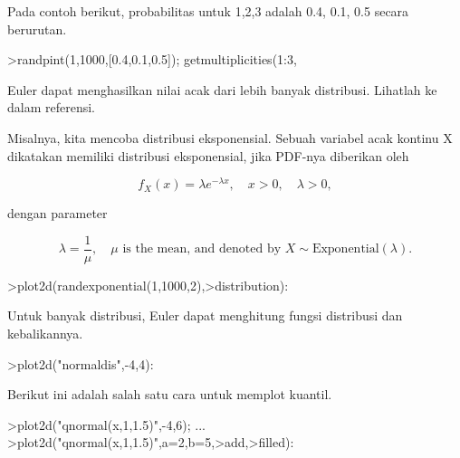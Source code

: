 \documentclass[12pt,Times new roman,letterpaper]{book}
\begin{document}
\begin{eulernootebook}
\begin{eulercomment}
\begin{eulercomment}
\begin{eulernootebook}
\begin{eulercomment}
\begin{eulercomment}
\begin{eulercomment}
\begin{eulercomment}
\begin{eulercomment}
\begin{eulercomment}
\begin{eulercomment}
\begin{eulercomment}
Pada contoh berikut, probabilitas untuk 1,2,3 adalah 0.4, 0.1, 0.5
secara berurutan.
\end{eulercomment}
\begin{eulerprompt}
>randpint(1,1000,[0.4,0.1,0.5]); getmultiplicities(1:3,%
\end{eulerprompt}
\begin{euleroutput}
  [378,  102,  520]
\end{euleroutput}
\begin{eulercomment}
Euler dapat menghasilkan nilai acak dari lebih banyak distribusi.
Lihatlah ke dalam referensi.

Misalnya, kita mencoba distribusi eksponensial. Sebuah variabel acak
kontinu X dikatakan memiliki distribusi eksponensial, jika PDF-nya
diberikan oleh\\
\end{eulercomment}
\begin{eulerformula}
\[
f_X(x)=\lambda e^{-\lambda x},\quad x>0,\quad \lambda>0,
\]
\end{eulerformula}
\begin{eulercomment}
dengan parameter\\
\end{eulercomment}
\begin{eulerformula}
\[
\lambda=\frac{1}{\mu},\quad \mu \text{ is the mean, and denoted by } X \sim \text{Exponential}(\lambda).
\]
\end{eulerformula}
\begin{eulerprompt}
>plot2d(randexponential(1,1000,2),>distribution):
\end{eulerprompt}
\begin{eulercomment}
Untuk banyak distribusi, Euler dapat menghitung fungsi distribusi dan
kebalikannya.
\end{eulercomment}
\begin{eulerprompt}
>plot2d("normaldis",-4,4): 
\end{eulerprompt}
\begin{eulercomment}
Berikut ini adalah salah satu cara untuk memplot kuantil.
\end{eulercomment}
\begin{eulerprompt}
>plot2d("qnormal(x,1,1.5)",-4,6);  ...
>plot2d("qnormal(x,1,1.5)",a=2,b=5,>add,>filled):
\end{eulerprompt}

\end{eulercomment}
\end{eulercomment}
\end{eulercomment}
\end{eulercomment}
\end{eulercomment}
\end{eulercomment}
\end{eulercomment}
\end{eulernootebook}
\end{eulercomment}
\end{eulercomment}
\end{eulernootebook}
\end{document}
